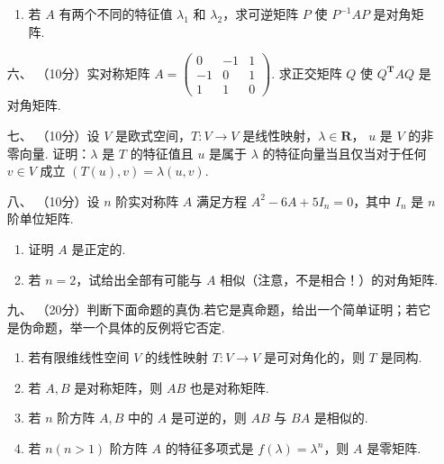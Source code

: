 \begin{enumerate}
\begin{enumerate}[label=(\arabic*)]
        \item 若 $A$ 有两个不同的特征值 $\lambda_1$ 和 $\lambda_2$，求可逆矩阵 $P$ 使 $P^{-1}AP$ 是对角矩阵.
    \end{enumerate}
    \item [六、]（10分）实对称矩阵 $A=\begin{pmatrix}0 & -1 & 1 \\ -1 & 0 & 1 \\ 1 & 1 & 0\end{pmatrix}.$ 求正交矩阵 $Q$ 使 $Q^\mathbf{T}AQ$ 是对角矩阵.
    \item [七、]（10分）设 $V$ 是欧式空间，$T:V\to V$ 是线性映射，$\lambda \in \mathbf{R}$， $u$ 是 $V$ 的非零向量.
    证明：$\lambda$ 是 $T$ 的特征值且 $u$ 是属于 $\lambda$ 的特征向量当且仅当对于任何 $v\in V$ 成立 $(T(u),v) = \lambda(u,v).$
    \item [八、]（10分）设 $n$ 阶实对称阵 $A$ 满足方程 $A^2-6A+5I_n=0$，其中 $I_n$ 是 $n$ 阶单位矩阵.
    \begin{enumerate}[label=(\arabic*)]
        \item 证明 $A$ 是正定的.
        \item 若 $n=2$，试给出全部有可能与 $A$ 相似（注意，不是相合！）的对角矩阵.
    \end{enumerate}
    \item [九、]（20分）判断下面命题的真伪.若它是真命题，给出一个简单证明；若它是伪命题，举一个具体的反例将它否定.
    \begin{enumerate}[label=(\arabic*)]
        \item 若有限维线性空间 $V$ 的线性映射 $T:V \to V$ 是可对角化的，则 $T$ 是同构.
        \item 若 $A,B$ 是对称矩阵，则 $AB$ 也是对称矩阵.
        \item 若 $n$ 阶方阵 $A,B$ 中的 $A$ 是可逆的，则 $AB$ 与 $BA$ 是相似的.
        \item 若 $n(n>1)$ 阶方阵 $A$ 的特征多项式是 $f(\lambda)=\lambda^n$，则 $A$ 是零矩阵.
    \end{enumerate}
\end{enumerate}

\newpage
